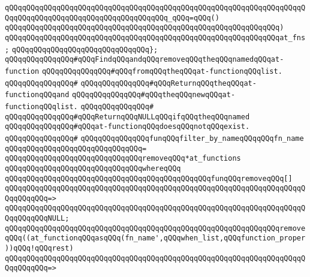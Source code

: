 \verb|qQQqqQQqqQQqqQQqqQQqqQQqqQQqqQQqqQQqqQQqqQQqqQQqqQQqqQQqqQQqqQQqqQQqqQQqqQQqqQQqqQQqqQQqqQQqqQQqqQQqqQQqqQQq_qQQq=qQQq()|\newline
\verb|qQQqqQQqqQQqqQQqqQQqqQQqqQQqqQQqqQQqqQQqqQQqqQQqqQQqqQQqqQQqqQQq)|\newline
\verb|qQQqqQQqqQQqqQQqqQQqqQQqqQQqqQQqqQQqqQQqqQQqqQQqqQQqqQQqqQQqqQQqat_fns;|\newline
\verb|qQQqqQQqqQQqqQQqqQQqqQQqqQQqqQQq};|\newline
\newline
\newline
\verb|qQQqqQQqqQQqqQQq#qQQqFindqQQqandqQQqremoveqQQqtheqQQqnamedqQQqat-function|\newline
\verb|qQQqqQQqqQQqqQQq#qQQqfromqQQqtheqQQqat-functionqQQqlist.|\newline
\verb|qQQqqQQqqQQqqQQq#|\newline
\verb|qQQqqQQqqQQqqQQq#qQQqReturnqQQqtheqQQqat-functionqQQqand|\newline
\verb|qQQqqQQqqQQqqQQq#qQQqtheqQQqnewqQQqat-functionqQQqlist.|\newline
\verb|qQQqqQQqqQQqqQQq#|\newline
\verb|qQQqqQQqqQQqqQQq#qQQqReturnqQQqNULLqQQqifqQQqtheqQQqnamed|\newline
\verb|qQQqqQQqqQQqqQQq#qQQqat-functionqQQqdoesqQQqnotqQQqexist.|\newline
\verb|qQQqqQQqqQQqqQQq#|\newline
\verb|qQQqqQQqqQQqqQQqfunqQQqfilter_by_nameqQQqqQQqfn_name|\newline
\verb|qQQqqQQqqQQqqQQqqQQqqQQqqQQqqQQq=|\newline
\verb|qQQqqQQqqQQqqQQqqQQqqQQqqQQqqQQqremoveqQQq*at_functions|\newline
\verb|qQQqqQQqqQQqqQQqqQQqqQQqqQQqqQQqwhereqQQq|\newline
\verb|qQQqqQQqqQQqqQQqqQQqqQQqqQQqqQQqqQQqqQQqqQQqqQQqfunqQQqremoveqQQq[]|\newline
\verb|qQQqqQQqqQQqqQQqqQQqqQQqqQQqqQQqqQQqqQQqqQQqqQQqqQQqqQQqqQQqqQQqqQQqqQQqqQQqqQQq=>|\newline
\verb|qQQqqQQqqQQqqQQqqQQqqQQqqQQqqQQqqQQqqQQqqQQqqQQqqQQqqQQqqQQqqQQqqQQqqQQqqQQqqQQqNULL;|\newline
\newline
\verb|qQQqqQQqqQQqqQQqqQQqqQQqqQQqqQQqqQQqqQQqqQQqqQQqqQQqqQQqqQQqqQQqremoveqQQq((at_functionqQQqasqQQq(fn_name',qQQqwhen_list,qQQqfunction_proper))qQQq!qQQqrest)|\newline
\verb|qQQqqQQqqQQqqQQqqQQqqQQqqQQqqQQqqQQqqQQqqQQqqQQqqQQqqQQqqQQqqQQqqQQqqQQqqQQqqQQq=>|\newline
